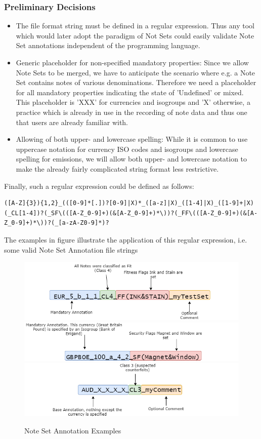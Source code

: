 \subsubsection{Preliminary Decisions}
\begin{itemize}
\item The file format string must be defined in a regular expression. Thus any tool which would later adopt the paradigm of Not Sets could easily validate Note Set annotations independent of the programming language.
\item Generic placeholder for non-specified mandatory properties: Since we allow Note Sets to be merged, we have to anticipate the scenario where e.g. a Note Set contains notes of various denominations. Therefore we need a placeholder for all mandatory properties indicating the state of 'Undefined' or mixed. This placeholder is 'XXX' for currencies and isogroups and 'X' otherwise, a practice which is already in use in the recording of note data and thus one that users are already familiar with. 
\item Allowing of both upper- and lowercase spelling: While it is common to use uppercase notation for currency ISO codes and isogroups and lowercase spelling for emissions, we will allow both upper- and lowercase notation to make the already fairly complicated string format less restrictive.
\end{itemize}
Finally, such a regular expression could be defined as follows:

\begin{center} 
\begin{verbatim}
([A-Z]{3}){1,2}_(([0-9]*[.])?[0-9]|X)*_([a-z]|X)_([1-4]|X)_([1-9]+|X)(_CL[1-4])?(_SF\(([A-Z_0-9]+)(&[A-Z_0-9]+)*\))?(_FF\(([A-Z_0-9]+)(&[A-Z_0-9]+)*\))?(_[a-zA-Z0-9]*)?
\end{verbatim}
\end{center} 
The examples in figure  illustrate the application of this regular expression, i.e. some valid Note Set Annotation file strings
\begin{figure}[!htb]
  \includegraphics[width=0.49\linewidth]{images/annotation_example1.png}
  \includegraphics[width=0.49\linewidth]{images/annotation_example2.png}
  \includegraphics[width=0.49\linewidth]{images/annotation_example3.png}
  \caption{Note Set Annotation Examples}\label{fig:ns_example}
\end{figure}


